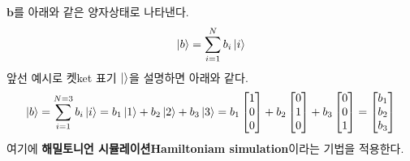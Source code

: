 \documentclass[a4paper,atbegshi,chapter]{oblivoir}
\begin{document}
$\mathbf{b}$를 아래와 같은 양자상태로 나타낸다.
\[
  \ket{b}=\sum_{i=1}^N b_i\ket{i}
\]
앞선 예시로 켓{\footnotesize ket} 표기 $\ket{}$을 설명하면 아래와 같다.
\[
  \ket{b}=\sum_{i=1}^{N=3}b_i\ket{i}=b_1\ket1+b_2\ket2+b_3\ket3=
  b_1\begin{bmatrix}1\\0\\0\end{bmatrix}+b_2\begin{bmatrix}0\\1\\0\end{bmatrix}+
  b_3\begin{bmatrix}0\\0\\1\end{bmatrix}=\begin{bmatrix}b_1\\b_2\\b_3\end{bmatrix}
\]
여기에 \textbf{해밀토니언 시뮬레이션\tiny Hamiltoniam simulation}이라는 기법을
적용한다.
\end{document}
